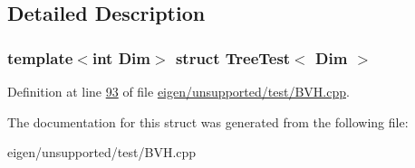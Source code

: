 \subsection{Detailed Description}
\subsubsection*{template$<$int Dim$>$\newline
struct Tree\+Test$<$ Dim $>$}



Definition at line \hyperlink{eigen_2unsupported_2test_2_b_v_h_8cpp_source_l00093}{93} of file \hyperlink{eigen_2unsupported_2test_2_b_v_h_8cpp_source}{eigen/unsupported/test/\+B\+V\+H.\+cpp}.



The documentation for this struct was generated from the following file\+:\begin{DoxyCompactItemize}
\item 
eigen/unsupported/test/\+B\+V\+H.\+cpp\end{DoxyCompactItemize}
